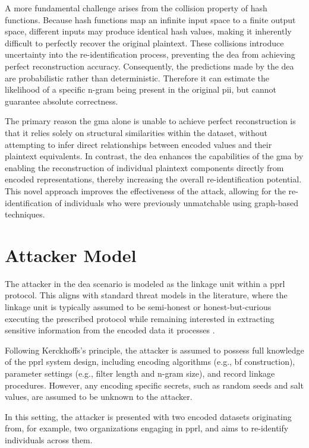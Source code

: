 A more fundamental challenge arises from the collision property of hash functions.
Because hash functions map an infinite input space to a finite output space, different inputs may produce identical hash values, making it inherently difficult to perfectly recover the original plaintext.
These collisions introduce uncertainty into the re-identification process, preventing the \ac{dea} from achieving perfect reconstruction accuracy.
Consequently, the predictions made by the \ac{dea} are probabilistic rather than deterministic. Therefore it can estimate the likelihood of a specific n-gram being present in the original \ac{pii}, but cannot guarantee absolute correctness.

The primary reason the \ac{gma} alone is unable to achieve perfect reconstruction is that it relies solely on structural similarities within the dataset, without attempting to infer direct relationships between encoded values and their plaintext equivalents.
In contrast, the \ac{dea} enhances the capabilities of the \ac{gma} by enabling the reconstruction of individual plaintext components directly from encoded representations, thereby increasing the overall re-identification potential.
This novel approach improves the effectiveness of the attack, allowing for the re-identification of individuals who were previously unmatchable using graph-based techniques.


\section{Attacker Model}

The attacker in the \ac{dea} scenario is modeled as the linkage unit within a \ac{pprl} protocol.
This aligns with standard threat models in the literature, where the linkage unit is typically assumed to be semi-honest or honest-but-curious executing the prescribed protocol while remaining interested in extracting sensitive information from the encoded data it processes \cite{schaefer2024}.

Following Kerckhoffs’s principle, the attacker is assumed to possess full knowledge of the \ac{pprl} system design, including encoding algorithms (e.g., \ac{bf} construction), parameter settings (e.g., filter length and n-gram size), and record linkage procedures.
However, any encoding specific secrets, such as random seeds and salt values, are assumed to be unknown to the attacker.

In this setting, the attacker is presented with two encoded datasets originating from, for example, two organizations engaging in \ac{pprl}, and aims to re-identify individuals across them.


